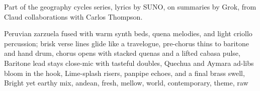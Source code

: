 
\begin{notes}
Part of the geography cycles series, lyrics by SUNO, on summaries by Grok, from Claud collaborations with Carlos Thompson.
\end{notes}
\begin{style}
Peruvian zarzuela fused with warm synth beds, quena melodies, and light criollo percussion; brisk verse lines glide like a travelogue, pre-chorus thins to baritone and hand drum, chorus opens with stacked quenas and a lifted cabasa pulse, Baritone lead stays close-mic with tasteful doubles, Quechua and Aymara ad-libs bloom in the hook, Lime-splash risers, panpipe echoes, and a final brass swell, Bright yet earthy mix, andean, fresh, mellow, world, contemporary, theme, raw
\end{style}
